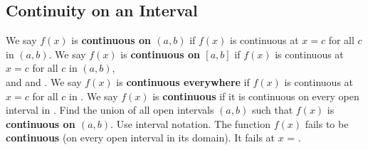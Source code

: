 \documentclass[10pt, addpoints]{exam}
\begin{document}
\begin{questions}
\section{Continuity on an Interval}
We say $f(x)$ is \textbf{continuous on \boldmath $(a,b)$}
	if $f(x)$ is continuous at $x=c$ for all $c$ in $(a,b)$.
\question We say $f(x)$ is \textbf{continuous on \boldmath $[a,b]$}
	if $f(x)$ is continuous at $x=c$ for all $c$ in $(a,b)$, \\[3ex]
	and \fillin[right continuous at $x=a$][3in]
	and \fillin[left continuous at $x=a$][3in].
\question We say $f(x)$ is \textbf{continuous everywhere}
	if $f(x)$ is continuous at $x=c$ for all $c$ in \fillin[][1in].
\question We say $f(x)$ is \textbf{continuous} if it is continuous on every open interval in \fillin[][2.5in].
\question Find the union of all open intervals $(a,b)$ such that $f(x)$ is \textbf{continuous on \boldmath $(a,b)$}. Use interval notation.
\question The function $f(x)$ fails to be \textbf{continuous} (on every open interval in its domain). 
	It fails at $x$ = \fillin[][1.4in].

\end{questions}
\end{document}
